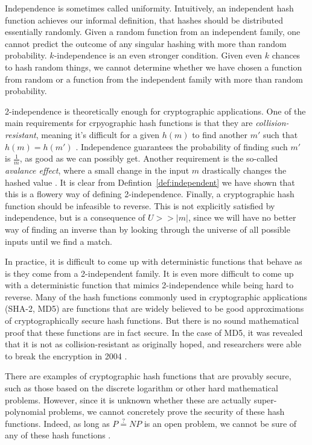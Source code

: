 \documentclass[titlepage]{article}
\theoremstyle{definition}
\begin{document}
Independence is sometimes called uniformity. Intuitively, an independent hash function achieves our informal definition, that hashes should be distributed essentially randomly. Given a random function from an independent family, one cannot predict the outcome of any singular hashing with more than random probability. $k$-independence is an even stronger condition. Given even $k$ chances to hash random things, we cannot determine whether we have chosen a function from random or a function from the independent family with more than random probability.

2-independence is theoretically enough for cryptographic applications. One of the main requirements for crpyographic hash functions is that they are \textit{collision-resistant}, meaning it's difficult for a given $h(m)$ to find another $m'$ such that $h(m) = h(m')$ \cite{PractCrypt}. Independence guarantees the probability of finding such $m'$ is $\frac{1}{m}$, as good as we can possibly get. Another requirement is the so-called \textit{avalance effect}, where a small change in the input $m$ drastically changes the hashed value \cite{PractCrypt}. It is clear from Defintion~\ref{def:independent} we have shown that this is a flowery way of defining 2-independence. Finally, a cryptographic hash function should be infeasible to reverse. This is not explicitly satisfied by independence, but is a consequence of $U >> |m|$, since we will have no better way of finding an inverse than by looking through the universe of all possible inputs until we find a match.

In practice, it is difficult to come up with deterministic functions that behave as is they come from a 2-independent family. It is even more difficult to come up with a deterministic function that mimics 2-independence while being hard to reverse. Many of the hash functions commonly used in cryptographic applications (SHA-2, MD5) are functions that are widely believed to be good approximations of cryptographically secure hash functions. But there is no sound mathematical proof that these functions are in fact secure. In the case of MD5, it was revealed that it is not as collision-resistant as originally hoped, and researchers were able to break the encryption in 2004 \cite{MD5}.

There are examples of cryptographic hash functions that are  provably secure, such as those based on the discrete logarithm or other hard mathematical problems. However, since it is unknown whether these are actually super-polynomial problems, we cannot concretely prove the security of these hash functions. Indeed, as long as $P \overset{?}{=} NP$ is an open problem, we cannot be sure of any of these hash functions \cite{Textbook}.
\end{document}
